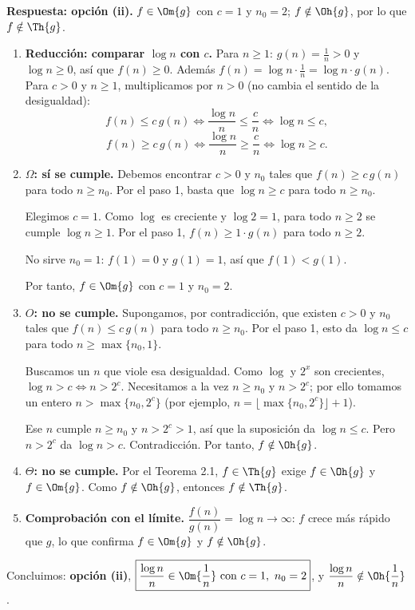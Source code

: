 
\textbf{Respuesta: opción (ii).} $f\in\Om{g}$ con $c=1$ y $n_0=2$; $f\notin\Oh{g}$, por lo que $f\notin\Th{g}$.

\begin{enumerate}
\item \textbf{Reducción: comparar $\log n$ con $c$.} Para $n\ge1$: $g(n)=\frac1n>0$ y $\log n\ge0$, así que $f(n)\ge0$. Además $f(n)=\log n\cdot\frac1n=\log n\cdot g(n)$. Para $c>0$ y $n\ge1$, multiplicamos por $n>0$ (no cambia el sentido de la desigualdad):
\[
f(n)\le c\,g(n)\iff \frac{\log n}{n}\le\frac{c}{n}\iff \log n\le c,
\]
\[
f(n)\ge c\,g(n)\iff \frac{\log n}{n}\ge\frac{c}{n}\iff \log n\ge c.
\]

\item \textbf{$\Omega$: sí se cumple.} Debemos encontrar $c>0$ y $n_0$ tales que $f(n)\ge c\,g(n)$ para todo $n\ge n_0$. Por el paso 1, basta que $\log n\ge c$ para todo $n\ge n_0$.

Elegimos $c=1$. Como $\log$ es creciente y $\log 2=1$, para todo $n\ge2$ se cumple $\log n\ge1$. Por el paso 1, $f(n)\ge1\cdot g(n)$ para todo $n\ge2$.

No sirve $n_0=1$: $f(1)=0$ y $g(1)=1$, así que $f(1)<g(1)$.

Por tanto, $f\in\Om{g}$ con $c=1$ y $n_0=2$.

\item \textbf{$O$: no se cumple.} Supongamos, por contradicción, que existen $c>0$ y $n_0$ tales que $f(n)\le c\,g(n)$ para todo $n\ge n_0$. Por el paso 1, esto da $\log n\le c$ para todo $n\ge\max\{n_0,1\}$.

Buscamos un $n$ que viole esa desigualdad. Como $\log$ y $2^x$ son crecientes, $\log n>c\iff n>2^c$. Necesitamos a la vez $n\ge n_0$ y $n>2^c$; por ello tomamos un entero $n>\max\{n_0,2^c\}$ (por ejemplo, $n=\lfloor\max\{n_0,2^c\}\rfloor+1$).

Ese $n$ cumple $n\ge n_0$ y $n>2^c>1$, así que la suposición da $\log n\le c$. Pero $n>2^c$ da $\log n>c$. Contradicción. Por tanto, $f\notin\Oh{g}$.

\item \textbf{$\Theta$: no se cumple.} Por el Teorema 2.1, $f\in\Th{g}$ exige $f\in\Oh{g}$ y $f\in\Om{g}$. Como $f\notin\Oh{g}$, entonces $f\notin\Th{g}$.

\item \textbf{Comprobación con el límite.} $\dfrac{f(n)}{g(n)}=\log n\to\infty$: $f$ crece más rápido que $g$, lo que confirma $f\in\Om{g}$ y $f\notin\Oh{g}$.
\end{enumerate}

Concluimos: \textbf{opción (ii)}, $\boxed{\dfrac{\log n}{n}\in\Om{\dfrac1n}\ \text{con } c=1,\ n_0=2}$, y $\dfrac{\log n}{n}\notin\Oh{\dfrac1n}$.
\fin
